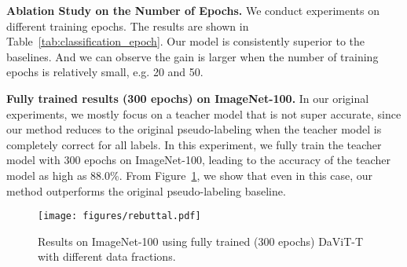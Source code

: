 \begin{table}[!htbp]
\footnotesize
\centering
\caption{Ablation study on the number of epochs. All models are trained using 10\% labeled data on ImageNet-100.}
\setlength{\tabcolsep}{10pt}
\renewcommand\arraystretch{1.2}
    \label{tab:classification_epoch}
\end{table}


\noindent \textbf{Ablation Study on the Number of Epochs.}
We conduct experiments on different training epochs. The results are shown in Table~\ref{tab:classification_epoch}. Our model is consistently superior to the baselines. And we can observe the gain is larger when the number of training epochs is relatively small, e.g. 20 and 50.

\noindent \textbf{Fully trained results (300 epochs) on ImageNet-100.}
In our original experiments, we mostly focus on a teacher model that is not super accurate, since our method reduces to the original pseudo-labeling when the teacher model is completely correct for all labels. In this experiment, we fully train the teacher model with 300 epochs on ImageNet-100, leading to the accuracy of the teacher model as high as 88.0\%. From Figure~\ref{fig:rebuttal}, we show that even in this case, our method outperforms the original pseudo-labeling baseline.

\begin{figure}[!htbp]
  \centering
  \caption{Results on ImageNet-100 using fully trained (300 epochs) DaViT-T with different data fractions.}
  \texttt{[image: figures/rebuttal.pdf]}
  \label{fig:rebuttal}
\end{figure}


